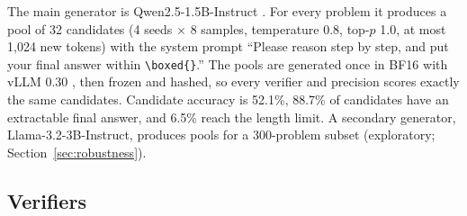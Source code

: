 \begin{table}[!htb]
\centering
\small
\caption{Principal evaluation populations. ``New'' problems appear nowhere else in this
work (text-level exclusion against all other items and against all of
MATH500).}\label{tab:populations}
\end{table}

The main generator is Qwen2.5-1.5B-Instruct \cite{qwen2.5}. For every problem it
produces a pool of 32 candidates (4 seeds $\times$ 8 samples, temperature 0.8,
top-$p$ 1.0, at most 1,024 new tokens) with the system prompt ``Please reason step by
step, and put your final answer within \texttt{\textbackslash boxed\{\}}.'' The pools
are generated once in BF16 with vLLM 0.30 \cite{kwon2023vllm}, then frozen and hashed,
so every verifier and precision scores exactly the same candidates. Candidate accuracy
is 52.1\%, 88.7\% of candidates have an extractable final answer, and 6.5\% reach the
length limit. A secondary generator, Llama-3.2-3B-Instruct, produces pools for a
300-problem subset (exploratory; Section~\ref{sec:robustness}).

\subsection{Verifiers}\label{sec:verifiers}

